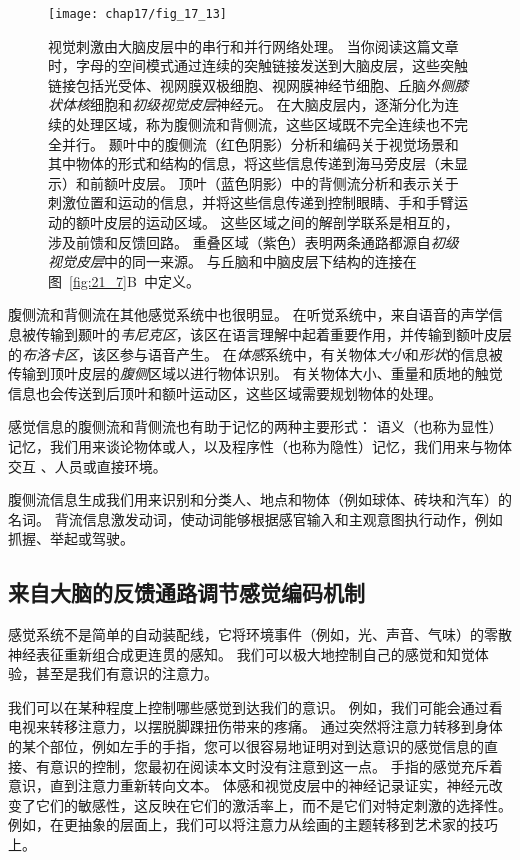 \begin{figure}[htbp]
	\centering
	\texttt{[image: chap17/fig\_17\_13]}
	\caption{视觉刺激由大脑皮层中的串行和并行网络处理。 
		当你阅读这篇文章时，字母的空间模式通过连续的突触链接发送到大脑皮层，这些突触链接包括光受体、视网膜双极细胞、视网膜神经节细胞、丘脑\textit{外侧膝状体核}细胞和\textit{初级视觉皮层}神经元。
		在大脑皮层内，逐渐分化为连续的处理区域，称为腹侧流和背侧流，这些区域既不完全连续也不完全并行。
		颞叶中的腹侧流（红色阴影）分析和编码关于视觉场景和其中物体的形式和结构的信息，将这些信息传递到海马旁皮层（未显示）和前额叶皮层。
		顶叶（蓝色阴影）中的背侧流分析和表示关于刺激位置和运动的信息，并将这些信息传递到控制眼睛、手和手臂运动的额叶皮层的运动区域。
		这些区域之间的解剖学联系是相互的，涉及前馈和反馈回路。
		重叠区域（紫色）表明两条通路都源自\textit{初级视觉皮层}中的同一来源。
		与丘脑和中脑皮层下结构的连接在图~\ref{fig:21_7}B~中定义\cite{albright2002contextual}。}
	\label{fig:17_13}
\end{figure}


腹侧流和背侧流在其他感觉系统中也很明显。
在听觉系统中，来自语音的声学信息被传输到颞叶的\textit{韦尼克区}，该区在语言理解中起着重要作用，并传输到额叶皮层的\textit{布洛卡区}，该区参与语音产生。
在\textit{体感}系统中，有关物体\textit{大小}和\textit{形状}的信息被传输到顶叶皮层的\textit{腹侧}区域以进行物体识别。
有关物体大小、重量和质地的触觉信息也会传送到后顶叶和额叶运动区，这些区域需要规划物体的处理。


感觉信息的腹侧流和背侧流也有助于记忆的两种主要形式：
语义（也称为显性）记忆，我们用来谈论物体或人，以及程序性（也称为隐性）记忆，我们用来与物体交互 、人员或直接环境。


腹侧流信息生成我们用来识别和分类人、地点和物体（例如球体、砖块和汽车）的名词。 
背流信息激发动词，使动词能够根据感官输入和主观意图执行动作，例如抓握、举起或驾驶。



\subsection{来自大脑的反馈通路调节感觉编码机制}

感觉系统不是简单的自动装配线，它将环境事件（例如，光、声音、气味）的零散神经表征重新组合成更连贯的感知。
我们可以极大地控制自己的感觉和知觉体验，甚至是我们有意识的注意力。


我们可以在某种程度上控制哪些感觉到达我们的意识。
例如，我们可能会通过看电视来转移注意力，以摆脱脚踝扭伤带来的疼痛。 
通过突然将注意力转移到身体的某个部位，例如左手的手指，您可以很容易地证明对到达意识的感觉信息的直接、有意识的控制，您最初在阅读本文时没有注意到这一点。
手指的感觉充斥着意识，直到注意力重新转向文本。
体感和视觉皮层中的神经记录证实，神经元改变了它们的敏感性，这反映在它们的激活率上，而不是它们对特定刺激的选择性。
例如，在更抽象的层面上，我们可以将注意力从绘画的主题转移到艺术家的技巧上。


